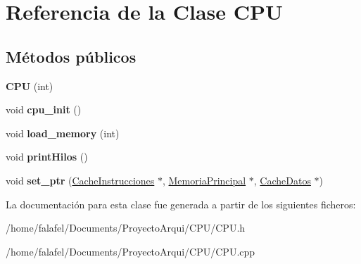\hypertarget{classCPU}{}\section{Referencia de la Clase C\+PU}
\label{classCPU}
\subsection*{Métodos públicos}
\begin{DoxyCompactItemize}
\item 
\mbox{\label{classCPU_adb7f83411e262b4e7f635c3f7a9a28b6}} 
{\bfseries C\+PU} (int)
\item 
\mbox{\label{classCPU_a06f4d0b7369cb2520e7795a77d18887d}} 
void {\bfseries cpu\+\_\+init} ()
\item 
\mbox{\label{classCPU_aa0c0e71485431029b7c5a484ff64fc79}} 
void {\bfseries load\+\_\+memory} (int)
\item 
\mbox{\label{classCPU_a5f109b7be44b7f800938c3de9ebbc2a4}} 
void {\bfseries print\+Hilos} ()
\item 
\mbox{\label{classCPU_a35a1e7218a033321c7261b211da029e5}} 
void {\bfseries set\+\_\+ptr} (\hyperlink{classCacheInstrucciones}{Cache\+Instrucciones} $\ast$, \hyperlink{classMemoriaPrincipal}{Memoria\+Principal} $\ast$, \hyperlink{classCacheDatos}{Cache\+Datos} $\ast$)
\end{DoxyCompactItemize}


La documentación para esta clase fue generada a partir de los siguientes ficheros\+:\begin{DoxyCompactItemize}
\item 
/home/falafel/\+Documents/\+Proyecto\+Arqui/\+C\+P\+U/C\+P\+U.\+h\item 
/home/falafel/\+Documents/\+Proyecto\+Arqui/\+C\+P\+U/C\+P\+U.\+cpp\end{DoxyCompactItemize}
